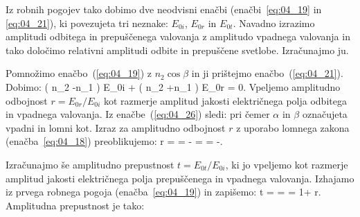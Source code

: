 Iz robnih
pogojev tako dobimo dve neodvisni enačbi (enačbi~\ref{eq:04_19} in \ref{eq:04_21}), 
ki povezujeta tri neznake: $E_{0i}$, $E_{0r}$ in $E_{0t}$. Navadno izrazimo amplitudi
odbitega in prepuščenega valovanja z amplitudo vpadnega valovanja in tako določimo 
relativni amplitudi odbite in prepuščene svetlobe. Izračunajmo ju.

Pomnožimo enačbo~(\ref{eq:04_19}) z $n_2 \cos \beta$ in ji prištejmo
enačbo~(\ref{eq:04_21}). Dobimo:
\beq
\left( n_2 \cos \beta-n_1 \cos \alpha\right) E_{0i} + 
\left( n_2 \cos \beta+n_1 \cos \alpha\right) E_{0r} = 0.
\label{eq:04_26}
\eeq
Vpeljemo amplitudno odbojnost $r = E_{0r}/E_{0i}$ 
kot razmerje amplitud jakosti električnega polja odbitega in vpadnega valovanja.
Iz enačbe~(\ref{eq:04_26}) sledi:
pri čemer $\alpha$ in $\beta$ označujeta vpadni in lomni kot. Izraz za amplitudno odbojnost
$r$ z uporabo lomnega zakona (enačba~\ref{eq:04_18}) preoblikujemo:
\beq
r =  = 
\frac{\frac{\sin \beta}{\sin \alpha} \cos \alpha - \cos \beta}
{\frac{\sin \beta}{\sin \alpha} \cos \alpha - \cos \beta} = \frac{\sin \beta \cos \alpha -
\cos \beta \sin \alpha}{\sin \beta \cos \alpha + \cos \beta \sin \alpha} = 
-\frac{\sin (\alpha -\beta)}{\sin (\alpha + \beta)}.
\label{eq:04_27}
\eeq

Izračunajmo še amplitudno prepustnost $t = E_{0t}/E_{0i}$, ki jo vpeljemo
kot razmerje amplitud jakosti električnega polja prepuščenega in vpadnega valovanja. Izhajamo
iz prvega robnega pogoja (enačba~\ref{eq:04_19}) in zapišemo:
\beq
t =  =  = 1+ r.
\label{eq:04_28}
\eeq
Amplitudna prepustnost je tako:

